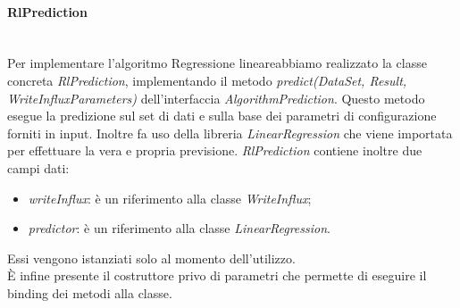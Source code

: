 \paragraph*{RlPrediction} \mbox{}\\ [1mm]
Per implementare l'algoritmo Regressione lineare\glosp abbiamo realizzato la classe concreta \textit{RlPrediction}, implementando il metodo \textit{predict(DataSet, Result, WriteInfluxParameters)} dell'interfaccia \textit{AlgorithmPrediction}.
Questo metodo esegue la predizione sul set di dati e sulla base dei parametri di configurazione forniti in input. Inoltre fa uso della libreria \textit{LinearRegression} che viene importata per effettuare la vera e propria previsione. \textit{RlPrediction} contiene inoltre due campi dati:
\begin{itemize}
	\item \textit{writeInflux}: è un riferimento alla classe \textit{WriteInflux};
	\item \textit{predictor}: è un riferimento alla classe \textit{LinearRegression}.
\end{itemize}
Essi vengono istanziati solo al momento dell'utilizzo. \\
È infine presente il costruttore privo di parametri che permette di eseguire il binding dei metodi alla classe.
